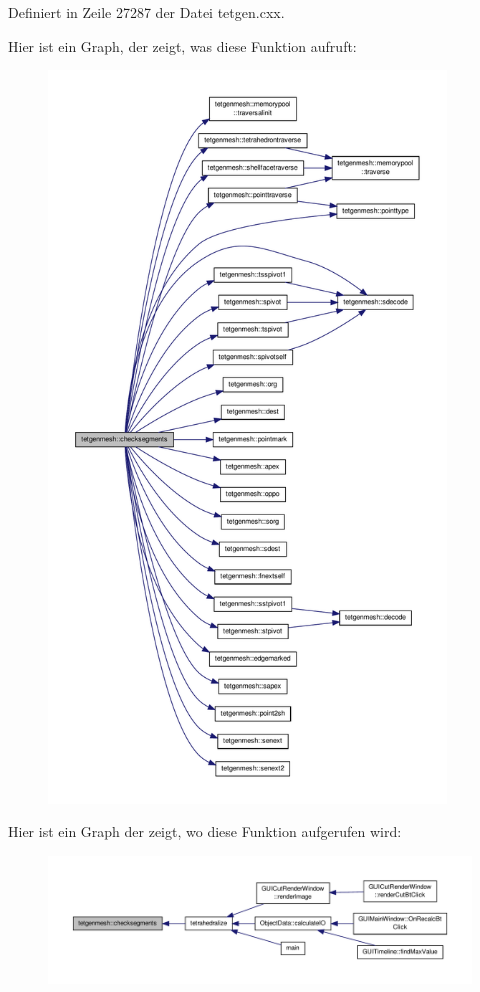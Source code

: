 Definiert in Zeile 27287 der Datei tetgen.\-cxx.



Hier ist ein Graph, der zeigt, was diese Funktion aufruft\-:\nopagebreak
\begin{figure}[H]
\begin{center}
\leavevmode
\includegraphics[height=550pt]{classtetgenmesh_ae2cbec9eb2c18f23e2046780841c9f6a_cgraph}
\end{center}
\end{figure}




Hier ist ein Graph der zeigt, wo diese Funktion aufgerufen wird\-:\nopagebreak
\begin{figure}[H]
\begin{center}
\leavevmode
\includegraphics[width=350pt]{classtetgenmesh_ae2cbec9eb2c18f23e2046780841c9f6a_icgraph}
\end{center}
\end{figure}



